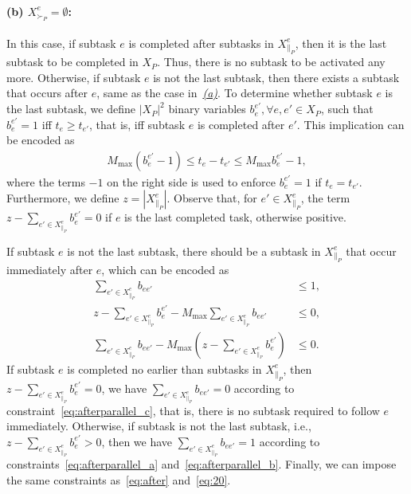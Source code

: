\documentclass[Afour,sageh,times]{sagej}
\begin{document}
{{{\paragraph{(b)  $ X^e_{\succ_{P}} = \emptyset$:} In this case, if subtask $e$ is completed after  subtasks in  $X_{\|_P}^e$, then it is the last  subtask  to be completed in  $X_P$. Thus, there is no subtask to be activated any more. Otherwise, if subtask $e$ is not the last subtask, then there exists a subtask that occurs after $e$, same as the case in~\hyperref[activation:a]{\it (a)}. To determine whether subtask $e$ is the last subtask, we define $|X_P|^2$ binary variables $b_{e}^{e'}, \forall e, e' \in X_P$,  such that $b_{e}^{e'}=1$  iff $t_{e} \geq t_{e'}$, that is, iff subtask $e$ is completed after $e'$. This implication can be encoded as
\begingroup\makeatletter\def\f@size{10}\check@mathfonts
\def\maketag@@@#1{\hbox{\m@th\normalsize\normalfont#1}}%
\begin{align}
  M_{\text{max}} (b_{e}^{e'} - 1) \leq t_e -  t_{e'} \leq M_{\text{max}} b_{e}^{e'} -1,
\end{align}
  \endgroup
 where the terms $-1$ on the right side is used to enforce $b_{e}^{e'}=1$ if $t_e = t_{e'}$. Furthermore, we define $z = |X^e_{\|_{P}}|$. Observe that, for $e' \in X^e_{\|_{P}} $, the term $z -  \sum_{e' \in X^e_{\|_{P}}  } b_{e}^{e'} = 0$ if $e$ is the last completed task, otherwise  positive.

If subtask $e$ is not the last subtask, there should be a subtask in $X^e_{\|_{P}}$ that occur immediately after $e$, which can be encoded as
\begingroup\makeatletter\def\f@size{10}\check@mathfonts
\def\maketag@@@#1{\hbox{\m@th\normalsize\normalfont#1}}%
\begin{subequations}\label{eq:afterparallel}
  \begin{align}
  \sum_{e' \in X_{\|_P}^e} b_{ee'} & \le 1,\label{eq:afterparallel_a}\\
  z - \sum_{e' \in X^e_{\|_{P}}  } b_{e}^{e'} - M_{\text{max}}  \sum_{e' \in X_{\|_P}^e} b_{ee'} &  \leq 0, \label{eq:afterparallel_b} \\
  \sum_{e' \in X_{\|_P}^e} b_{ee'} - M_{\text{max}}(z -  \sum_{e' \in X^e_{\|_{P}}  } b_{e}^{e'}) & \leq0 . \label{eq:afterparallel_c}
\end{align}
\end{subequations}
\endgroup
If subtask $e$ is completed no earlier than subtasks in  $X_{\|_P}^e$, then $z - \sum_{e' \in X^e_{\|_{P}}  } b_{e}^{e'} = 0$, we have $ \sum_{e' \in X_{\|_P}^e} b_{ee'}=0$ according to constraint~\eqref{eq:afterparallel_c}, that is, there is no subtask required to follow $e$ immediately. Otherwise, if subtask is not the last subtask, i.e., $z - \sum_{e' \in X^e_{\|_{P}}  } b_{e}^{e'} > 0$, then we have $ \sum_{e' \in X_{\|_P}^e} b_{ee'}=1$ according to constraints~\eqref{eq:afterparallel_a} and~\eqref{eq:afterparallel_b}. Finally, we can impose the same constraints as~\eqref{eq:after} and~\eqref{eq:20}.

}}}
\end{document}
